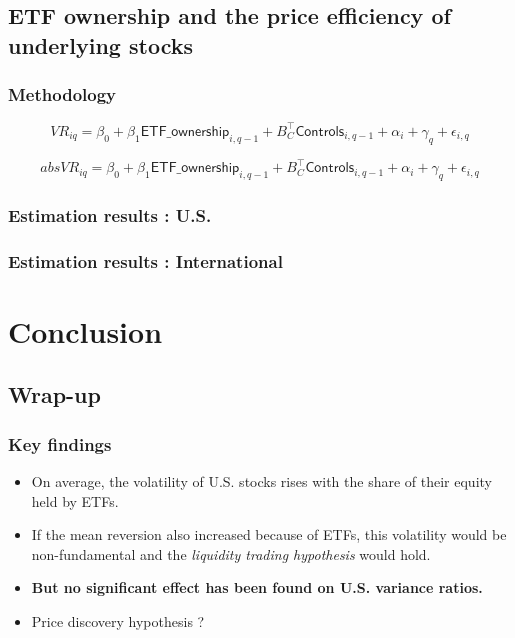 \documentclass[9pt, usenames, dvipsnames]{beamer}
\begin{document}
\subsection{ETF ownership and the price efficiency of underlying stocks}
\begin{frame}
  \frametitle{Methodology}
  
\begin{equation}
  VR_{iq} = \beta_{0} + \beta_{1} \mathsf{ETF\_ownership}_{i, q - 1} + B_{C}^{\intercal} \mathsf{Controls}_{i, q - 1} + \alpha_{i} + \gamma_{q} + \epsilon_{i, q}
\end{equation}

\begin{equation}
 absVR_{iq} = \beta_{0} + \beta_{1} \mathsf{ETF\_ownership}_{i, q - 1} + B_{C}^{\intercal} \mathsf{Controls}_{i, q - 1} + \alpha_{i} + \gamma_{q} + \epsilon_{i, q}
\end{equation}

\end{frame}

\begin{frame}
  \frametitle{Estimation results : U.S.}
  \centering
  
\end{frame}

\begin{frame}
  \frametitle{Estimation results : International}
  \centering
  
\end{frame}

\section{Conclusion}
\subsection{Wrap-up}

\begin{frame}
  \frametitle{Key findings}
  \begin{itemize}
  \item On average, the volatility of U.S. stocks rises with the share of their equity held by ETFs.
  \item If the mean reversion also increased because of ETFs, this volatility would be non-fundamental and the \emph{liquidity trading hypothesis} would hold.
  \item \textbf{But no significant effect has been found on U.S. variance ratios.}
  \item Price discovery hypothesis ?
  \end{itemize}
\end{frame}
\end{document}
